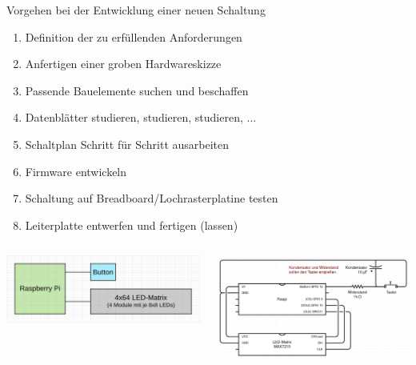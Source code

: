 \begin{frame}[allowframebreaks]{Vorgehen bei der Entwicklung einer neuen Schaltung}
    \begin{enumerate}
        \item Definition der zu erfüllenden Anforderungen
        \item Anfertigen einer groben Hardwareskizze
        \item Passende Bauelemente suchen und beschaffen
        \item Datenblätter studieren, studieren, studieren, ...
        \item Schaltplan Schritt für Schritt ausarbeiten
        \item Firmware entwickeln
        \item Schaltung auf Breadboard/Lochrasterplatine testen
        \item Leiterplatte entwerfen und fertigen (lassen)
    \end{enumerate}

    \begin{columns}
        \includegraphics[width=\textwidth]{2-hardwaredesign/img/vorgehen_skizze}

        \includegraphics[width=\textwidth]{2-hardwaredesign/img/vorgehen_schaltplan}
    \end{columns}


\end{frame}
